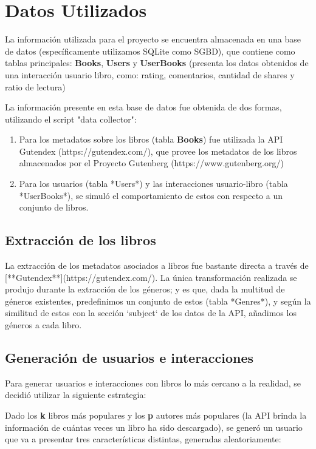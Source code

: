 \documentclass[14pt]{extarticle}
\begin{document}
\section{Datos Utilizados}

La información utilizada para el proyecto se encuentra almacenada en una base de datos (específicamente utilizamos SQLite como SGBD), que contiene como tablas principales: \textbf{Books}, \textbf{Users} y \textbf{UserBooks} (presenta los datos obtenidos de una interacción usuario libro, como: rating, comentarios, cantidad de shares y ratio de lectura)

La información presente en esta base de datos fue obtenida de dos formas, utilizando el script "data collector":

\begin{enumerate}
    \item Para los metadatos sobre los libros (tabla \textbf{Books}) fue utilizada la API Gutendex (https://gutendex.com/), que provee los metadatos de los libros almacenados por el Proyecto Gutenberg (https://www.gutenberg.org/)
    \item Para los usuarios (tabla *Users*) y las interacciones usuario-libro (tabla *UserBooks*), se simuló el comportamiento de estos con respecto a un conjunto de libros.
\end{enumerate}

\subsection{Extracción de los libros}

La extracción de los metadatos asociados a libros fue bastante directa a través de [**Gutendex**](https://gutendex.com/). La única transformación realizada se produjo durante la extracción de los géneros; y es que, dada la multitud de géneros existentes, predefinimos un conjunto de estos (tabla *Genres*), y según la similitud de estos con la sección `subject` de los datos de la API, añadimos los géneros a cada libro.

\subsection{Generación de usuarios e interacciones}

Para generar usuarios e interacciones con libros lo más cercano a la realidad, se decidió utilizar la siguiente estrategia:

Dado los \textbf{k} libros más populares y los \textbf{p} autores más populares (la API brinda la información de cuántas veces un libro ha sido descargado), se generó un usuario que va a presentar tres características distintas, generadas aleatoriamente:
\end{document}
